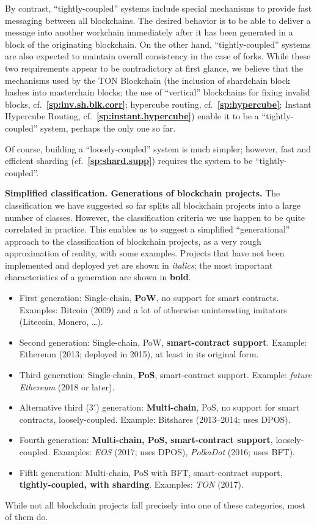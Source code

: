 \documentclass[12pt,oneside]{article}
\def\makepoint#1{\medbreak\noindent{\bf #1.\ }}
\def\nxsubpoint{\refstepcounter{subsubsection}%
  \smallbreak\makepoint{\thesubsubsection}}
\def\refpoint#1{{\rm\textbf{\ref{#1}}}}
\let\ptref=\refpoint
\def\embt(#1.){\textbf{#1.}}
\begin{document}
By contrast, ``tightly-coupled'' systems include special mechanisms to
provide fast messaging between all blockchains. The desired behavior
is to be able to deliver a message into another workchain immediately
after it has been generated in a block of the originating
blockchain. On the other hand, ``tightly-coupled'' systems are also
expected to maintain overall consistency in the case of forks. While
these two requirements appear to be contradictory at first glance, we
believe that the mechanisms used by the TON Blockchain (the inclusion
of shardchain block hashes into masterchain blocks; the use of
``vertical'' blockchains for fixing invalid blocks,
cf.~\ptref{sp:inv.sh.blk.corr}; hypercube routing,
cf.~\ptref{sp:hypercube}; Instant Hypercube Routing,
cf.~\ptref{sp:instant.hypercube}) enable it to be a
``tightly-coupled'' system, perhaps the only one so far.

Of course, building a ``loosely-coupled'' system is much simpler;
however, fast and efficient sharding (cf.~\ptref{sp:shard.supp})
requires the system to be ``tightly-coupled''.

\nxsubpoint\label{sp:blkch.gen} \embt(Simplified
classification. Generations of blockchain projects.)  The
classification we have suggested so far splits all blockchain projects
into a large number of classes. However, the classification criteria
we use happen to be quite correlated in practice. This enables us to
suggest a simplified ``generational'' approach to the classification
of blockchain projects, as a very rough approximation of reality,
with some examples. Projects that have not been implemented and
deployed yet are shown in {\em italics}; the most important
characteristics of a generation are shown in {\bf bold}.
\begin{itemize}
\item First generation: Single-chain, {\bf PoW}, no support for smart
  contracts. Examples: Bitcoin (2009) and a lot of otherwise
  uninteresting imitators (Litecoin, Monero, \dots).
\item Second generation: Single-chain, PoW, {\bf smart-contract
  support}. Example: Ethereum (2013; deployed in 2015), at least in
  its original form.
\item Third generation: Single-chain, {\bf PoS}, smart-contract
  support. Example: {\em future Ethereum} (2018 or later).
\item Alternative third ($3'$) generation: {\bf Multi-chain}, PoS, no
  support for smart contracts, loosely-coupled. Example: Bitshares
  (2013--2014; uses DPOS).
\item Fourth generation: {\bf Multi-chain, PoS, smart-contract
  support}, loosely-coupled. Examples: {\em EOS\/} (2017; uses DPOS),
  {\em PolkaDot\/} (2016; uses BFT).
\item Fifth generation: Multi-chain, PoS with BFT, smart-contract
  support, {\bf tightly-coupled, with sharding}. Examples: {\em TON\/}
  (2017).
\end{itemize}
While not all blockchain projects fall precisely into one of these
categories, most of them do.
\end{document}

